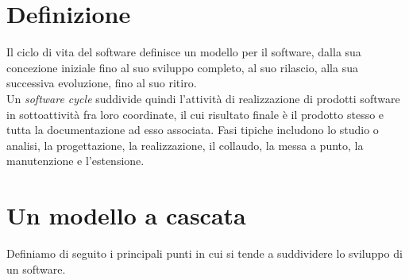 \section{Definizione}
Il ciclo di vita del software definisce un modello per il software, dalla sua concezione iniziale fino al suo sviluppo completo, al suo rilascio, alla sua successiva evoluzione, fino al suo ritiro. \\
Un \textit{software cycle} suddivide quindi l'attività di realizzazione di prodotti software in sottoattività fra loro coordinate, il cui risultato finale è il prodotto stesso e tutta la documentazione ad esso associata. Fasi tipiche includono lo studio o analisi, la progettazione, la realizzazione, il collaudo, la messa a punto, la manutenzione e l'estensione.

\section{Un modello a cascata}
Definiamo di seguito i principali punti in cui si tende a suddividere lo sviluppo di un software.
